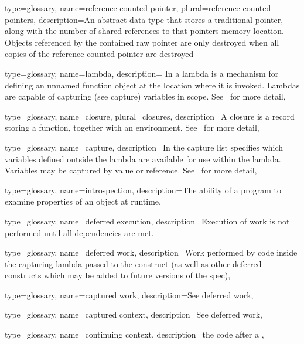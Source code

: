 {
  type=glossary,
  name={reference counted pointer},
  plural={reference counted pointers},
  description={An abstract data type that stores a traditional pointer, along
    with the number of shared references to that pointers
    memory location.  Objects referenced by the contained raw pointer are only
     destroyed when all copies of the reference counted pointer are destroyed} 
}

{
  type=glossary,
  name={lambda},
  description={ In \CC{} a lambda is a mechanism for 
    defining an unnamed function object at the location 
    where it is invoked. Lambdas are capable of capturing (see \gls{capture}) variables in
    scope. See~\cite{lambda} for more detail},
}

{
  type={glossary},
  name={closure},
  plural={closures},
  description={A closure is a record storing a function, together with an
    environment.  See~\cite{closure} for more detail},
}

{
  type=glossary,
  name=capture,
  description={In \CC{} the capture list specifies which variables defined
    outside the lambda are available for use within the lambda. Variables may
    be captured by value or reference.  See~\cite{lambda} for more detail},
}

{
  type=glossary,
  name=introspection,
  description={The ability of a program to examine properties of an object at
    runtime},
}

{
  type=glossary,
  name={deferred execution},
  description={Execution of work is not performed until all dependencies are
    met.}
  }

{
  type=glossary,
  name={deferred work},
  description={Work
performed by code inside the capturing lambda passed to the
 construct (as well as other deferred constructs which
may be added to future versions of the spec)},
}


{
  type=glossary,
  name={captured work},
  description={See \gls{deferred work}},
}

{
  type=glossary,
  name={captured context},
  description={See \gls{deferred work}},
}

{
  type=glossary,
  name={continuing context},
  description={the code after a },
}

